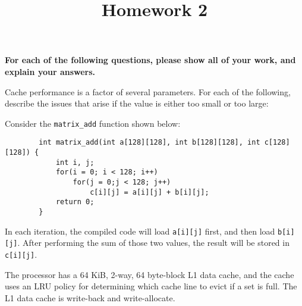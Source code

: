 \documentclass{exam}
\title{Homework 2}
\author{}
\begin{document}
\maketitle
\thispagestyle{foot}

\textbf{For each of the following questions, please show all of your work, and
explain your answers.}

\begin{questions}
    \question Cache performance is a factor of several parameters. For each of
    the following, describe the issues that arise if the value is either too
    small or too large:

    \newpage
    \question Consider the \texttt{matrix\_add} function shown below:

    \begin{verbatim}
        int matrix_add(int a[128][128], int b[128][128], int c[128][128]) {
            int i, j;
            for(i = 0; i < 128; i++)
                for(j = 0;j < 128; j++)
                    c[i][j] = a[i][j] + b[i][j];
            return 0;
        }
    \end{verbatim}

    In each iteration, the compiled code will load \texttt{a[i][j]} first, and
    then load \texttt{b[i][j]}. After performing the sum of those two values,
    the result will be stored in \texttt{c[i][j]}.

    The processor has a 64 KiB, 2-way, 64 byte-block L1 data cache, and the
    cache uses an LRU policy for determining which cache line to evict if a set
    is full. The L1 data cache is write-back and write-allocate.


\end{questions}
\end{document}
